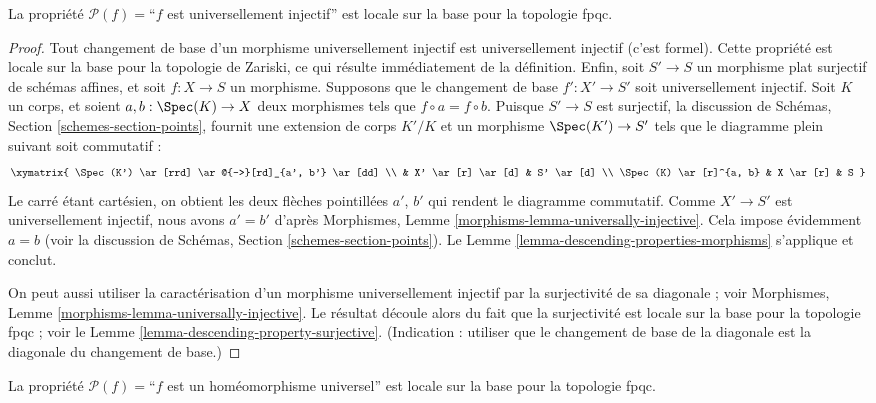 \begin{lemma}
\label{lemma-descending-property-universally-injective}
La propriété $\mathcal{P}(f) =$``$f$ est universellement injectif'' est locale
sur la base pour la topologie fpqc.
\end{lemma}

\begin{proof}
Tout changement de base d'un morphisme universellement injectif est
universellement injectif (c'est formel). Cette propriété est locale sur la
base pour la topologie de Zariski, ce qui résulte immédiatement de la
définition. Enfin, soit $S' \to S$ un morphisme plat surjectif de schémas
affines, et soit $f : X \to S$ un morphisme. Supposons que le changement de
base $f' : X' \to S'$ soit universellement injectif. Soit $K$ un corps, et
soient $a, b : \Spec(K) \to X$ deux morphismes tels que
$f \circ a = f \circ b$. Puisque $S' \to S$ est surjectif, la discussion de
Schémas, Section \ref{schemes-section-points}, fournit une extension de corps
$K'/K$ et un morphisme $\Spec(K')
\to S'$ tels que le diagramme plein suivant soit commutatif :
$$
\xymatrix{
\Spec(K') \ar[rrd] \ar@{-->}[rd]_{a', b'} \ar[dd] \\
 &
X' \ar[r] \ar[d] &
S' \ar[d] \\
\Spec(K) \ar[r]^{a, b} &
X \ar[r] &
S
}
$$
Le carré étant cartésien, on obtient les deux flèches pointillées $a'$, $b'$
qui rendent le diagramme commutatif. Comme $X' \to S'$ est universellement
injectif, nous avons $a' = b'$ d'après Morphismes, Lemme
\ref{morphisms-lemma-universally-injective}. Cela impose évidemment $a = b$
(voir la discussion de Schémas, Section \ref{schemes-section-points}). Le
Lemme \ref{lemma-descending-properties-morphisms} s'applique et conclut.

\medskip\noindent
On peut aussi utiliser la caractérisation d'un morphisme universellement
injectif par la surjectivité de sa diagonale ; voir Morphismes, Lemme
\ref{morphisms-lemma-universally-injective}. Le résultat découle alors du fait
que la surjectivité est locale sur la base pour la topologie fpqc ; voir le
Lemme \ref{lemma-descending-property-surjective}. (Indication : utiliser que
le changement de base de la diagonale est la diagonale du changement de base.)
\end{proof}

\begin{lemma}
\label{lemma-descending-property-universal-homeomorphism}
La propriété $\mathcal{P}(f) =$``$f$ est un homéomorphisme universel'' est
locale sur la base pour la topologie fpqc.
\end{lemma}


